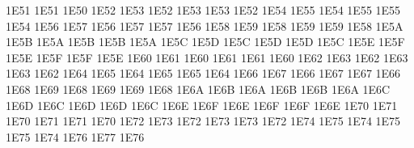 \setcclcucx 1E51 1E51 1E50 %
\setcclcucx 1E52 1E53 1E52 %
\setcclcucx 1E53 1E53 1E52 %
\setcclcucx 1E54 1E55 1E54 %
\setcclcucx 1E55 1E55 1E54 %
\setcclcucx 1E56 1E57 1E56 %
\setcclcucx 1E57 1E57 1E56 %
\setcclcucx 1E58 1E59 1E58 %
\setcclcucx 1E59 1E59 1E58 %
\setcclcucx 1E5A 1E5B 1E5A %
\setcclcucx 1E5B 1E5B 1E5A %
\setcclcucx 1E5C 1E5D 1E5C %
\setcclcucx 1E5D 1E5D 1E5C %
\setcclcucx 1E5E 1E5F 1E5E %
\setcclcucx 1E5F 1E5F 1E5E %
\setcclcucx 1E60 1E61 1E60 %
\setcclcucx 1E61 1E61 1E60 %
\setcclcucx 1E62 1E63 1E62 %
\setcclcucx 1E63 1E63 1E62 %
\setcclcucx 1E64 1E65 1E64 %
\setcclcucx 1E65 1E65 1E64 %
\setcclcucx 1E66 1E67 1E66 %
\setcclcucx 1E67 1E67 1E66 %
\setcclcucx 1E68 1E69 1E68 %
\setcclcucx 1E69 1E69 1E68 %
\setcclcucx 1E6A 1E6B 1E6A %
\setcclcucx 1E6B 1E6B 1E6A %
\setcclcucx 1E6C 1E6D 1E6C %
\setcclcucx 1E6D 1E6D 1E6C %
\setcclcucx 1E6E 1E6F 1E6E %
\setcclcucx 1E6F 1E6F 1E6E %
\setcclcucx 1E70 1E71 1E70 %
\setcclcucx 1E71 1E71 1E70 %
\setcclcucx 1E72 1E73 1E72 %
\setcclcucx 1E73 1E73 1E72 %
\setcclcucx 1E74 1E75 1E74 %
\setcclcucx 1E75 1E75 1E74 %
\setcclcucx 1E76 1E77 1E76 %
